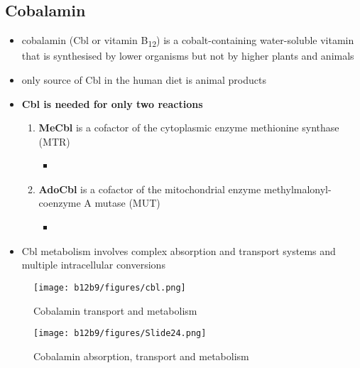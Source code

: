 \documentclass{scrartcl}
\begin{document}
\subsection{Cobalamin}
\label{sec:org61e984c}
\begin{itemize}
\item cobalamin (Cbl or vitamin B\textsubscript{12}) is a cobalt-containing
water-soluble vitamin that is synthesised by lower organisms but not
by higher plants and animals
\item only source of Cbl in the human diet is animal products
\item \textbf{Cbl is needed for only two reactions}
\begin{enumerate}
\item \textbf{MeCbl} is a cofactor of the cytoplasmic enzyme methionine synthase (MTR)
\begin{itemize}
\item {}
\end{itemize}
\item \textbf{AdoCbl} is a cofactor of the mitochondrial enzyme methylmalonyl-coenzyme A mutase (MUT)
\begin{itemize}
\item {}
\end{itemize}
\end{enumerate}
\item Cbl metabolism involves complex absorption and transport systems and
multiple intracellular conversions
\end{itemize}

\begin{figure}[htbp]
\centering
\texttt{[image: b12b9/figures/cbl.png]}
\caption{\label{fig:org7bf79fa}Cobalamin transport and metabolism}
\end{figure}

\begin{figure}[htbp]
\centering
\texttt{[image: b12b9/figures/Slide24.png]}
\caption{\label{fig:orgb1138cc}Cobalamin absorption, transport and metabolism}
\end{figure}
\end{document}
